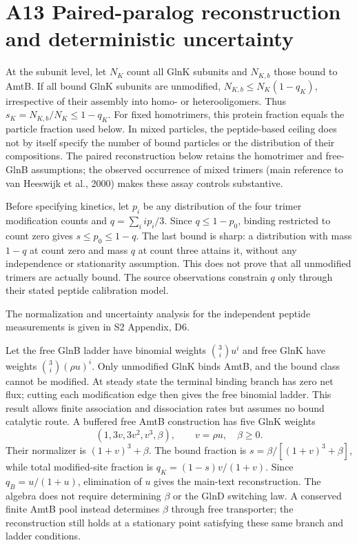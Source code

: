 \documentclass[11pt]{article}
\begin{document}
\section*{A13 Paired-paralog reconstruction and deterministic uncertainty}

At the subunit level, let $N_K$ count all GlnK subunits and $N_{K,b}$ those bound to AmtB. If all bound GlnK subunits are unmodified, $N_{K,b}\leq N_K(1-q_K)$, irrespective of their assembly into homo- or heterooligomers. Thus $s_K=N_{K,b}/N_K\leq1-q_K$. For fixed homotrimers, this protein fraction equals the particle fraction used below. In mixed particles, the peptide-based ceiling does not by itself specify the number of bound particles or the distribution of their compositions. The paired reconstruction below retains the homotrimer and free-GlnB assumptions; the observed occurrence of mixed trimers (main reference to van Heeswijk et al., 2000) makes these assay controls substantive.

Before specifying kinetics, let $p_i$ be any distribution of the four trimer modification counts and $q=\sum_i ip_i/3$. Since $q\leq1-p_0$, binding restricted to count zero gives $s\leq p_0\leq1-q$. The last bound is sharp: a distribution with mass $1-q$ at count zero and mass $q$ at count three attains it, without any independence or stationarity assumption. This does not prove that all unmodified trimers are actually bound. The source observations constrain $q$ only through their stated peptide calibration model.

The normalization and uncertainty analysis for the independent peptide measurements is given in S2 Appendix, D6.


Let the free GlnB ladder have binomial weights $\binom3i u^i$ and free GlnK have weights $\binom3i(\rho u)^i$. Only unmodified GlnK binds AmtB, and the bound class cannot be modified. At steady state the terminal binding branch has zero net flux; cutting each modification edge then gives the free binomial ladder. This result allows finite association and dissociation rates but assumes no bound catalytic route. A buffered free AmtB construction has five GlnK weights
\[
 (1,3v,3v^2,v^3,\beta),\qquad v=\rho u,\quad\beta\geq0.
\]
Their normalizer is $(1+v)^3+\beta$. The bound fraction is $s=\beta/[(1+v)^3+\beta]$, while total modified-site fraction is $q_K=(1-s)v/(1+v)$. Since $q_B=u/(1+u)$, elimination of $u$ gives the main-text reconstruction. The algebra does not require determining $\beta$ or the GlnD switching law. A conserved finite AmtB pool instead determines $\beta$ through free transporter; the reconstruction still holds at a stationary point satisfying these same branch and ladder conditions.
\end{document}
